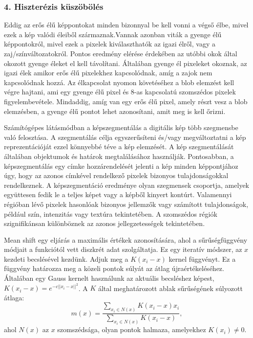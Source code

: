 \subsubsection{4. Hiszterézis küszöbölés}

Eddig az erős élű képpontokat minden bizonnyal be kell vonni a végső élbe, mivel ezek a kép valódi éleiből származnak.Vannak azonban viták a gyenge élű képpontokról, mivel ezek a pixelek kiválaszthatók az igazi élről, vagy a zaj/színváltozatokról. Pontos eredmény elérése érdekében az utóbbi okok által okozott gyenge éleket el kell távolítani. Általában gyenge él pixeleket okoznak, az igazi élek amikor erős élű pixelekhez kapcsolódnak, amíg a zajok nem kapcsolódnak hozzá. Az élkapcsolat nyomon követéséhez a blob elemzést kell végre hajtani, ami egy gyenge élű pixel és 8-as kapcsolatú szomszédos pixelek figyelembevétele. Mindaddig, amíg van egy erős élű pixel, amely részt vesz a blob elemzésben, a gyenge élű pontot lehet azonosítani, amit meg is kell őrizni.



Számítógépes látásmódban a képszegmentálás a digitális kép több szegmensbe való felosztása. A szegmentálás célja egyszerűsíteni és/vagy megváltoztatni a kép reprezentációját ezzel könnyebbé téve a kép elemzését. A kép szegmentálását általában objektumok és határok megtalálásához használják. Pontosabban, a képszegmentálás egy címke hozzárendelését jelenti a kép minden képpontjához úgy, hogy az azonos címkével rendelkező pixelek bizonyos tulajdonságokkal rendelkeznek. A képszegmentáció eredménye olyan szegmensek csoportja, amelyek együttesen fedik le a teljes képet vagy a képből kinyert kontúrt. Valamennyi régióban lévő pixelek hasonlóak bizonyos jellemzők vagy számított tulajdonságok, például szín, intenzitás vagy textúra tekintetében. A szomszédos régiók szignifikánsan különböznek az azonos jellegzetességek tekintetében.



Mean shift egy eljárás a maximális értékek azonosítására, ahol a sűrűségfüggvény módjait a funkciótól vett diszkrét adat szolgáltatja. Ez egy iteratív módszer, az $x$ kezdeti becslésével kezdünk. Adjuk meg a $K(x_i - x)$ kernel függvényt. Ez a függvény határozza meg a közeli pontok súlyát az átlag újraértékeléséhez. Általában egy Gauss kernelt használunk az aktuális becsléshez képest, $K (x_i - x) = e ^ {- c || x_i - x || ^ 2}$. A $K$ által meghatározott ablak sűrűségének súlyozott átlaga: 
$$
m(x) =
\frac{\sum_{x_i \in N(x)}K(x_i-x)x_i}{\sum_{x_i \in N(x)}K(x_i-x)},
$$
ahol $N(x)$ az $x$ szomszédsága, olyan pontok halmaza, amelyekhez $K(x_ {i}) \neq 0$.

